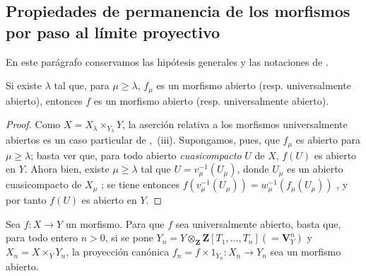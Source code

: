 \subsection{Propiedades de permanencia de los morfismos por paso al límite proyectivo}
\label{subsection:IV.8.10-fr}

En este parágrafo conservamos las hipótesis generales y las notaciones de .

\begin{proposition}[8.10.1]
Si existe $\lambda$ tal que, para $\mu\geq\lambda$, $f_\mu$ es un morfismo abierto \textup{(resp.} universalmente abierto\textup{)}, entonces $f$ es un morfismo abierto \textup{(resp.} universalmente abierto\textup{)}.
\end{proposition}

\begin{proof}
Como $X=X_\lambda\times_{Y_\lambda}Y$, la aserción relativa a los morfismos universalmente abiertos es un caso particular de ,~(iii).
Supongamos, pues, que $f_\mu$ es abierto para $\mu\geq\lambda$; basta ver que, para todo abierto \emph{cuasicompacto} $U$ de $X$, $f(U)$ es abierto en $Y$.
Ahora bien, existe $\mu\geq\lambda$ tal que $U=v_\mu^{-1}(U_\mu)$, donde $U_\mu$ es un abierto cuasicompacto de $X_\mu$ ; se tiene entonces $f(v_\mu^{-1}(U_\mu))=w_\mu^{-1}(f_\mu(U_\mu))$ , y por tanto $f(U)$ es abierto en $Y$.
\end{proof}

\begin{corollary}[8.10.2]
\label{IV.8.10.2-fr}
Sea $f:X\to Y$ un morfismo.
Para que $f$ sea universalmente abierto, basta que, para todo entero $n>0$, si se pone $Y_n=Y\otimes_{\mathbf Z}\mathbf Z[T_1,\ldots,T_n](=\mathbf V_Y^n)$ y $X_n=X\times_YY_n$, la proyección canónica $f_n=f\times1_{Y_n}:X_n\to Y_n$ sea un morfismo abierto.
\end{corollary}

